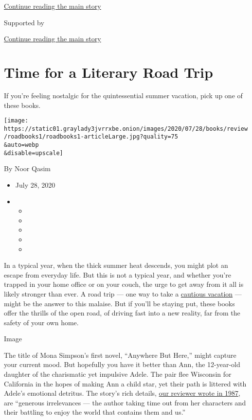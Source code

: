 \protect\hyperlink{after-top}{Continue reading the main story}

Supported by

\protect\hyperlink{after-sponsor}{Continue reading the main story}

\hypertarget{time-for-a-literary-road-trip}{%
\section{Time for a Literary Road
Trip}\label{time-for-a-literary-road-trip}}

If you're feeling nostalgic for the quintessential summer vacation, pick
up one of these books.

\texttt{[image: https://static01.graylady3jvrrxbe.onion/images/2020/07/28/books/review/roadbooks1/roadbooks1-articleLarge.jpg?quality=75\\\&auto=webp\\\&disable=upscale]}

By Noor Qasim

\begin{itemize}
\item
  July 28, 2020
\item
  \begin{itemize}
  \item
  \item
  \item
  \item
  \item
  \end{itemize}
\end{itemize}

In a typical year, when the thick summer heat descends, you might plot
an escape from everyday life. But this is not a typical year, and
whether you're trapped in your home office or on your couch, the urge to
get away from it all is likely stronger than ever. A road trip --- one
way to take a
\href{https://www.nytimes3xbfgragh.onion/2020/07/16/travel/virus-vacation.html?searchResultPosition=4}{cautious
vacation} --- might be the answer to this malaise. But if you'll be
staying put, these books offer the thrills of the open road, of driving
fast into a new reality, far from the safety of your own home.

Image

The title of Mona Simpson's first novel, ``Anywhere But Here,'' might
capture your current mood. But hopefully you have it better than Ann,
the 12-year-old daughter of the charismatic yet impulsive Adele. The
pair flee Wisconsin for California in the hopes of making Ann a child
star, yet their path is littered with Adele's emotional detritus. The
story's rich details,
\href{https://www.nytimes3xbfgragh.onion/1987/01/11/books/in-thrall-to-a-lethal-mother.html}{our
reviewer wrote in 1987}, are ``generous irrelevances --- the author
taking time out from her characters and their battling to enjoy the
world that contains them and us.''

